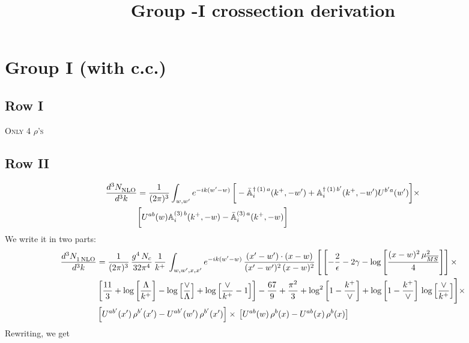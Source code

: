 \documentclass[9pt]{article}
\title{Group -I crossection derivation}
\author{}
\date{}
\def\mf#1{\mathbb{#1}}
\numberwithin{equation}{section}
\begin{document}
\maketitle
\section{Group I (with c.c.)}
\subsection{Row I\,}
\textsc{Only 4 $\rho$'s}
\subsection{Row II}
\begin{align}
    \frac{d^{3}N_{\rm NLO}^{\rm}}{d^{3}k} &  = \frac{1}{(2\pi)^{3}}  \int_{w, w^\prime} e^{-ik(w^\prime-w)}\,\bigg[-\bar{\mf{A}}^{\dagger\,(1)\,a}_{i}(k^{+},-w^{\prime})+\mf{A}^{\dagger\, (1)\, b^{\prime}}_{i}(k^{+},-w^{\prime})U^{b^{\prime}a}(w^{\prime})\bigg]\times \notag \\ & \bigg[U^{ab}(w)\mf{A}^{(3)\, b}_{i}(k^{+},- w)-\Bar{\mf{A}}^{(3)\, a}_{i}(k^{+}, - w)\bigg]\nonumber
\end{align}
We write it in two parts: 
\begin{align}
     \frac{d^{3}N_{1\,\rm NLO}^{\rm}}{d^{3}k} &  = \frac{1}{(2\pi)^{3}}\, \frac{g^{4}\,N_{c}}{32\pi^{4}}\,\frac{1}{k^{+}}\, \int_{w, w',x,x'} e^{-ik(w^\prime-w)}\, \frac{(x'-w')\cdot (x-w)}{(x'-w')^{2}\, (x-w)^{2}}\, \Bigg[\left[-\frac{2}{\epsilon}-2\gamma-\log{\left[\frac{(x-w)^{2}\,\mu^{2}_{\overline{MS}}}{4}\right]}\right]\times \notag \\ & \left[\frac{11}{3}+\log{\left[\frac{\Lambda}{k^{+}}\right]}-\log{\left[\frac{\vee}{\Lambda}\right]}+\log{\left[\frac{\vee}{k^{+}}-1\right]}\right]-\frac{67}{9}+\frac{\pi^{2}}{3}+\log^{2}{\left[1-\frac{k^{+}}{\vee}\right]}+\log{\left[1-\frac{k^{+}}{\vee}\right]}\,\log{\left[\frac{\vee}{k^{+}}\right]}\Bigg]\times\notag \\ & \left[U^{ab'}(x')\,\rho^{b'}(x') - U^{ab'}(w')\,\rho^{b'}(x')\right]\times\,\left[U^{ab}(w)\,\rho^{b}(x) - U^{ab}(x)\,\rho^{b}(x)\right]
\end{align}
Rewriting, we get
\end{document}
